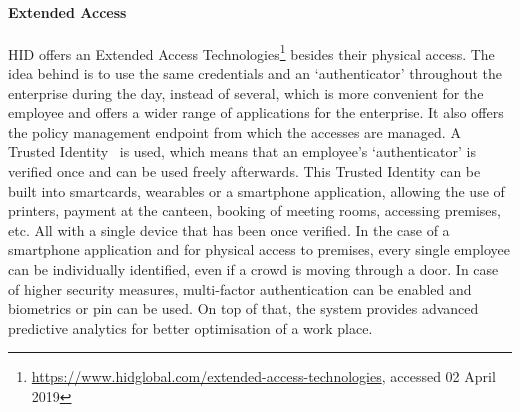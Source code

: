 \paragraph{Extended Access}
HID offers an Extended Access Technologies\footnote{\url{ https://www.hidglobal.com/extended-access-technologies}, accessed 02 April 2019} besides their physical access. The idea behind is to use the same credentials and an `authenticator' throughout the enterprise during the day, instead of several, which is more convenient for the employee and offers a wider range of applications for the enterprise. It also offers the policy management endpoint from which the accesses are managed. A Trusted Identity~\cite{2018ExperiencingPredictive} is used, which means that an employee’s ‘authenticator’ is verified once and can be used freely afterwards. This Trusted Identity can be built into smartcards, wearables or a smartphone application, allowing the use of printers, payment at the canteen, booking of meeting rooms, accessing premises, etc. All with a single device that has been once verified. In the case of a smartphone application and for physical access to premises, every single employee can be individually identified, even if a crowd is moving through a door. In case of higher security measures, multi-factor authentication can be enabled and biometrics or \acrshort{pin} can be used. On top of that, the system provides advanced predictive analytics for better optimisation of a work place.